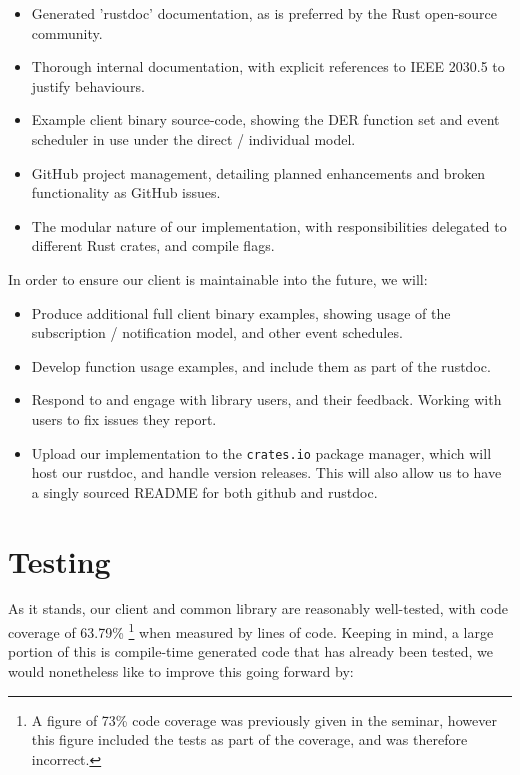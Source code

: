 \begin{itemize}
    \item Generated 'rustdoc' documentation, as is preferred by the Rust open-source community.
    \item Thorough internal documentation, with explicit references to IEEE 2030.5 to justify behaviours.
    \item Example client binary source-code, showing the DER function set and event scheduler in use under the direct / individual model.
    \item GitHub project management, detailing planned enhancements and broken functionality as GitHub issues.
    \item The modular nature of our implementation, with responsibilities delegated to different Rust crates, and compile flags.
\end{itemize}

In order to ensure our client is maintainable into the future, we will:

\begin{itemize}
    \item Produce additional full client binary examples, showing usage of the subscription / notification model, and other event schedules.
    \item Develop function usage examples, and include them as part of the rustdoc.
    \item Respond to and engage with library users, and their feedback. Working with users to fix issues they report.
    \item Upload our implementation to the \texttt{crates.io} package manager, which will host our rustdoc, and handle version releases. This will also allow us to have a singly sourced README for both github and rustdoc. 
\end{itemize}

\section{Testing}
As it stands, our client and common library are reasonably well-tested, with code coverage of 63.79\% \footnote{A figure of 73\% code coverage was previously given in the seminar, however this figure included the tests as part of the coverage, and was therefore incorrect.} when measured by lines of code. Keeping in mind, a large portion of this is compile-time generated code that has already been tested, we would nonetheless like to improve this going forward by:


